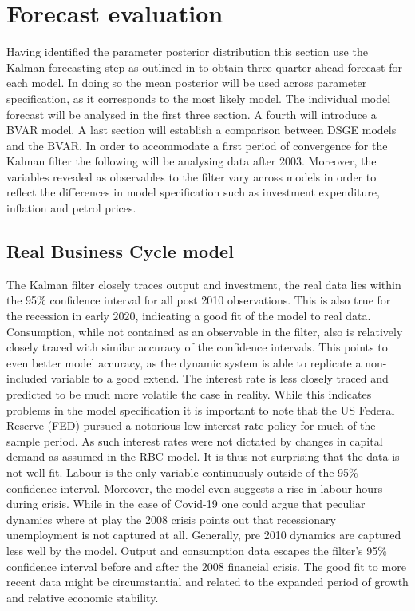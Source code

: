 \documentclass[12pt,a4paper,english]{article} %
\let\oldsection\section
\renewcommand\section{\clearpage\oldsection}
\begin{document}
	\section{Forecast evaluation} \label{forecast_eval}
	Having identified the parameter posterior distribution this section use the Kalman forecasting step as outlined in  to obtain three quarter ahead forecast for each model. In doing so the mean posterior will be used across parameter specification, as it corresponds to the most likely model.
	The individual model forecast will be analysed in the first three section. A fourth will introduce a \ac{BVAR} model. A last section will establish a comparison between DSGE models and the BVAR.
	In order to accommodate a first period of convergence for the Kalman filter the following will be analysing data after 2003. Moreover, the variables revealed as observables to the filter vary across models in order to reflect the differences in model specification such as investment expenditure, inflation and petrol prices. 
	
	\subsection{Real Business Cycle model}	
	The Kalman filter closely traces output and investment, the real data lies within the 95\% confidence interval for all post 2010 observations. This is also true for the recession in early 2020, indicating a good fit of the model to real data.
	Consumption, while not contained as an observable in the filter, also is relatively closely traced with similar accuracy of the confidence intervals. This points to even better model accuracy, as the dynamic system is able to replicate a non-included variable to a good extend. 	
	The interest rate is less closely traced and predicted to be much more volatile the case in reality. While this indicates problems in the model specification it is important to note that the US Federal Reserve (FED) pursued a notorious low interest rate policy for much of the sample period. As such interest rates were not dictated by changes in capital demand as assumed in the RBC model. It is thus not surprising that the data is not well fit.
	Labour is the only variable continuously outside of the 95\% confidence interval. Moreover, the model even suggests a rise in labour hours during crisis. While in the case of Covid-19 one could argue that peculiar dynamics where at play the 2008 crisis points out that recessionary unemployment is not captured at all. Generally, pre 2010 dynamics are captured less well by the model. Output and consumption data escapes the filter's 95\% confidence interval before and after the 2008 financial crisis. The good fit to more recent data might be circumstantial and related to the expanded period of growth and relative economic stability.
			
\end{document}
